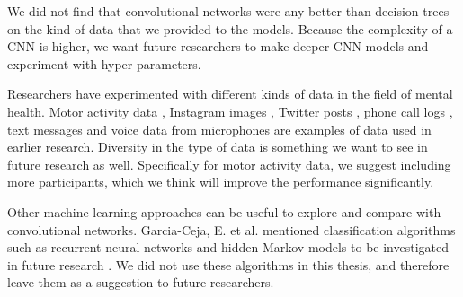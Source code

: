 We did not find that convolutional networks were any better than decision trees on the kind of data that we provided to the models. Because the complexity of a CNN is higher, we want future researchers to make deeper CNN models and experiment with hyper-parameters. 

Researchers have experimented with different kinds of data in the field of mental health. Motor activity data \cite{obrien_depression, GarciaCeja2018_classification_bipolar}, Instagram images \cite{instagram_depression}, Twitter posts \cite{twitter_depression}, phone call logs \cite{faurholt_smartphone_bipolar, grunerbl_smartphone_bipolar}, text messages and voice data from microphones \cite{grunerbl_smartphone_bipolar} are examples of data used in earlier research. Diversity in the type of data is something we want to see in future research as well. Specifically for motor activity data, we suggest including more participants, which we think will improve the performance significantly.

Other machine learning approaches can be useful to explore and compare with convolutional networks. Garcia-Ceja, E. et al. mentioned classification algorithms such as recurrent neural networks and hidden Markov models to be investigated in future research \cite{GarciaCeja2018_classification_bipolar}. We did not use these algorithms in this thesis, and therefore leave them as a suggestion to future researchers. 
